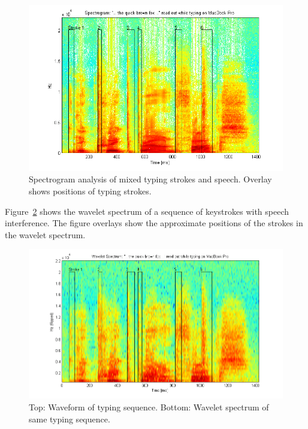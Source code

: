 \begin{figure}[!] %
\centering
\includegraphics[width=150mm]{spectrogramMarkedTapsBrownFox.png}
\caption{Spectrogram analysis of mixed typing strokes and speech. Overlay shows positions of typing strokes.}\label{fig:spectrogramMarkedTapsBrownFox}
\end{figure}

Figure~\ref{fig:waveletspectrumAno} shows the wavelet spectrum of a sequence of keystrokes with speech interference. The figure overlays show the approximate positions of the strokes in the wavelet spectrum.
\begin{figure}[!] %
\centering
\includegraphics[width=150mm]{waveletspectrumAno.png}
\caption{Top: Waveform of typing sequence. Bottom: Wavelet spectrum of same typing sequence.}\label{fig:waveletspectrumAno}
\end{figure}

